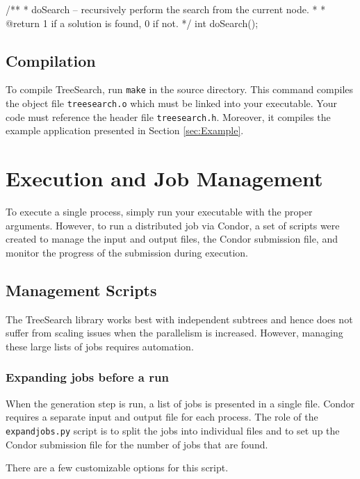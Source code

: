 \documentclass[11pt]{article}
\def\TreeSearch{{TreeSearch}}
\begin{document}
	/**
	 * doSearch -- recursively perform the search from the current node.
	 *
	 * @return 1 if a solution is found, 0 if not.
	 */
	int doSearch();
	
	



\subsection{Compilation}
\label{sec:Compilation}

To compile \TreeSearch, run \texttt{make} in the source directory.
This command compiles the object file \texttt{treesearch.o} which must be
	linked into your executable.
Your code must reference the header file \texttt{treesearch.h}.
Moreover, it compiles the example application presented in Section \ref{sec:Example}.

\section{Execution and Job Management}
\label{sec:Execution}

To execute a single process, simply run your executable with the proper arguments.
However, to run a distributed job via Condor, a set of scripts were created to manage
	the input and output files, the Condor submission file, and monitor the progress
	of the submission during execution.

\subsection{Management Scripts}


The {\TreeSearch} library works best with independent subtrees
	 and hence does not suffer from scaling issues when the parallelism is increased.
However, managing these large lists of jobs requires automation.

\subsubsection{Expanding jobs before a run}

When the generation step is run, a list of jobs is presented in a single file.
Condor requires a separate input and output file for each process.
The role of the \texttt{expandjobs.py} script is to split the jobs into individual 
	files and to set up the Condor submission file for the number of jobs that are found.

There are a few customizable options for this script.
\end{document}
